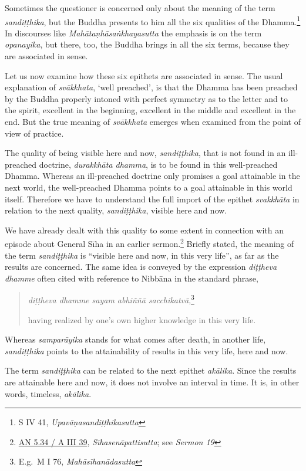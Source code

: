 Sometimes the questioner is concerned only about the meaning of the term \emph{sandiṭṭhika}, but the Buddha presents to him all the six qualities of the Dhamma.\footnote{S IV 41, \emph{Upavāṇasandiṭṭhikasutta}} In discourses like \emph{Mahātaṇhāsaṅkhayasutta} the emphasis is on the term \emph{opanayika}, but there, too, the Buddha brings in all the six terms, because they are associated in sense.

Let us now examine how these six epithets are associated in sense. The usual explanation of \emph{svākkhata}, `well preached', is that the Dhamma has been preached by the Buddha properly intoned with perfect symmetry as to the letter and to the spirit, excellent in the beginning, excellent in the middle and excellent in the end. But the true meaning of \emph{svākkhata} emerges when examined from the point of view of practice.

The quality of being visible here and now, \emph{sandiṭṭhika}, that is not found in an ill-preached doctrine, \emph{durakkhāta dhamma}, is to be found in this well-preached Dhamma. Whereas an ill-preached doctrine only promises a goal attainable in the next world, the well-preached Dhamma points to a goal attainable in this world itself. Therefore we have to understand the full import of the epithet \emph{svakkhāta} in relation to the next quality, \emph{sandiṭṭhika}, visible here and now.

We have already dealt with this quality to some extent in connection with an episode about General Sīha in an earlier sermon.\footnote{\href{https://suttacentral.net/an5.34/pli/ms}{AN 5.34 / A III 39}, \emph{Sīhasenāpattisutta}; see \emph{Sermon 19}} Briefly stated, the meaning of the term \emph{sandiṭṭhika} is ``visible here and now, in this very life'', as far as the results are concerned. The same idea is conveyed by the expression \emph{diṭṭheva dhamme} often cited with reference to Nibbāna in the standard phrase,

\begin{quote}
\emph{diṭṭheva dhamme sayam abhiññā sacchikatvā},\footnote{E.g.~M I 76, \emph{Mahāsīhanādasutta}}

having realized by one's own higher knowledge in this very life.
\end{quote}

Whereas \emph{samparāyika} stands for what comes after death, in another life, \emph{sandiṭṭhika} points to the attainability of results in this very life, here and now.

The term \emph{sandiṭṭhika} can be related to the next epithet \emph{akālika}. Since the results are attainable here and now, it does not involve an interval in time. It is, in other words, timeless, \emph{akālika}.

